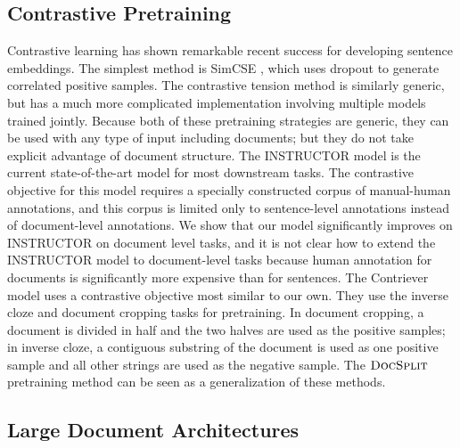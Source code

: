 \documentclass[11pt]{article}
\newcommand{\our}{\mbox{\textsc{DocSplit}}}
\begin{document}
\subsection{Contrastive Pretraining}
\label{sec:contrastive}

Contrastive learning has shown remarkable recent success for developing sentence embeddings.
The simplest method is SimCSE \cite{Gao2021SimCSESC},
which uses dropout to generate correlated positive samples.
The contrastive tension method \cite{Carlsson2021SemanticRW} is similarly generic,
but has a much more complicated implementation involving multiple models trained jointly.
Because both of these pretraining strategies are generic,
they can be used with any type of input including documents;
but they do not take explicit advantage of document structure.
The INSTRUCTOR model \cite{Su2022OneEA} is the current state-of-the-art model for most downstream tasks.
The contrastive objective for this model requires a specially constructed corpus of manual-human annotations,
and this corpus is limited only to sentence-level annotations instead of document-level annotations.
We show that our model significantly improves on INSTRUCTOR on document level tasks, and it is not clear how to extend the INSTRUCTOR model to document-level tasks because human annotation for documents is significantly more expensive than for sentences.
The Contriever model \cite{Izacard2021UnsupervisedDI} uses a contrastive objective most similar to our own.
They use the inverse cloze and document cropping tasks for pretraining.
In document cropping, a document is divided in half and the two halves are used as the positive samples;
in inverse cloze, a contiguous substring of the document is used as one positive sample and all other strings are used as the negative sample.
The $\our$ pretraining method can be seen as a generalization of these methods.

\subsection{Large Document Architectures}

\end{document}
